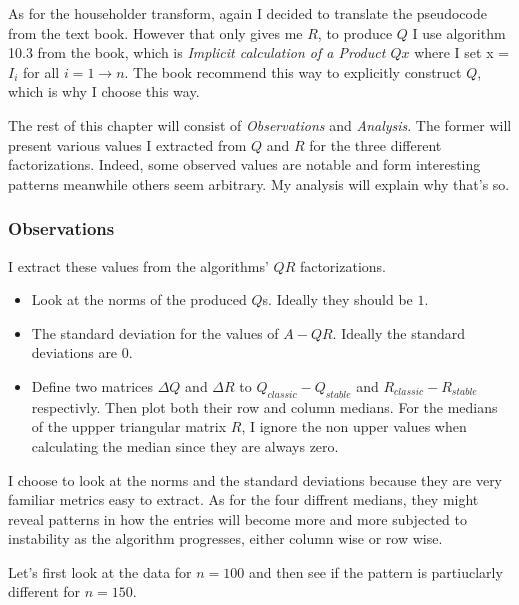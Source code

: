 \documentclass[a4paper,11pt]{article}
\begin{document}
As for the householder transform, again I decided to translate the
pseudocode from the text book. However that only gives me $R$, to
produce $Q$ I use algorithm 10.3 from the book, which is
\emph{Implicit calculation of a Product $Qx$} where I set x = $I_i$ for
all $i = 1 \to n$. The book recommend this way to explicitly construct
$Q$, which is why I choose this way.

The rest of this chapter will consist of \emph{Observations} and
\emph{Analysis}. The former will present various values I extracted from
$Q$ and $R$ for the three different factorizations. Indeed, some
observed values are notable and form interesting patterns meanwhile
others seem arbitrary. My analysis will explain why that's so.

\subsubsection{Observations}

I extract these values from the algorithms' $QR$ factorizations.

\begin{itemize}
  \item Look at the norms of the produced $Q$s. Ideally they should be $1$.
  \item The standard deviation for the values of $A-QR$. Ideally the
    standard deviations are $0$.
  \item Define two matrices $\Delta Q$ and $\Delta R$ to $Q_{classic} -
    Q_{stable}$ and $R_{classic} - R_{stable}$ respectivly. Then plot both
    their row and column medians. For the medians of the uppper
    triangular matrix $R$, I ignore the non upper values when
    calculating the median since they are always zero.

\end{itemize}

I choose to look at the norms and the standard deviations because they
are very familiar metrics easy to extract. As for the four diffrent
medians, they might reveal patterns in how the entries will
become more and more subjected to instability as the algorithm
progresses, either column wise or row wise.

Let's first look at the data for $n=100$ and then see if
the pattern is partiuclarly different for $n=150$.
\end{document}

